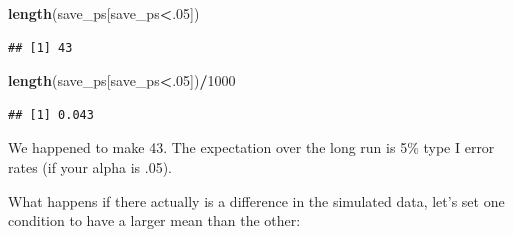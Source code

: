 \documentclass[
]{book}
\newenvironment{Shaded}{\begin{snugshade}}{\end{snugshade}}
\newcommand{\ControlFlowTok}[1]{\textcolor[rgb]{0.13,0.29,0.53}{\textbf{#1}}}
\newcommand{\DataTypeTok}[1]{\textcolor[rgb]{0.13,0.29,0.53}{#1}}
\newcommand{\DecValTok}[1]{\textcolor[rgb]{0.00,0.00,0.81}{#1}}
\newcommand{\KeywordTok}[1]{\textcolor[rgb]{0.13,0.29,0.53}{\textbf{#1}}}
\newcommand{\NormalTok}[1]{#1}
\newcommand{\OperatorTok}[1]{\textcolor[rgb]{0.81,0.36,0.00}{\textbf{#1}}}
\newcommand{\StringTok}[1]{\textcolor[rgb]{0.31,0.60,0.02}{#1}}
\begin{document}
\begin{Shaded}
\begin{Highlighting}[]
\KeywordTok{length}\NormalTok{(save_ps[save_ps}\OperatorTok{<}\NormalTok{.}\DecValTok{05}\NormalTok{])}
\end{Highlighting}
\end{Shaded}

\begin{verbatim}
## [1] 43
\end{verbatim}

\begin{Shaded}
\begin{Highlighting}[]
\KeywordTok{length}\NormalTok{(save_ps[save_ps}\OperatorTok{<}\NormalTok{.}\DecValTok{05}\NormalTok{])}\OperatorTok{/}\DecValTok{1000}
\end{Highlighting}
\end{Shaded}

\begin{verbatim}
## [1] 0.043
\end{verbatim}

We happened to make 43. The expectation over the long run is 5\% type I error rates (if your alpha is .05).

What happens if there actually is a difference in the simulated data, let's set one condition to have a larger mean than the other:

\begin{Shaded}
\end{Shaded}
\end{document}
